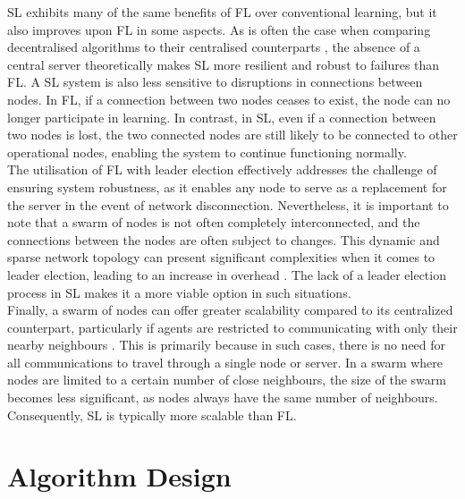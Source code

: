 \documentclass[letterpaper, 10 pt, conference]{ieeeconf}  %
\begin{document}
SL exhibits many of the same benefits of FL over conventional learning, but it also improves upon FL in some aspects. As is often the case when comparing decentralised algorithms to their centralised counterparts \cite{swarm_resil}, the absence of a central server theoretically makes SL more resilient and robust to failures than FL. A SL system is also less sensitive to disruptions in connections between nodes. In FL, if a connection between two nodes ceases to exist, the node can no longer participate in learning. In contrast, in SL, even if a connection between two nodes is lost, the two connected nodes are still likely to be connected to other operational nodes, enabling the system to continue functioning normally. \\

The utilisation of FL with leader election effectively addresses the challenge of ensuring system robustness, as it enables any node to serve as a replacement for the server in the event of network disconnection. Nevertheless, it is important to note that a swarm of nodes is not often completely interconnected, and the connections between the nodes are often subject to changes. This dynamic and sparse network topology can present significant complexities when it comes to leader election, leading to an increase in overhead \cite{leaderelection}. The lack of a leader election process in SL makes it a more viable option in such situations. \\

Finally, a swarm of nodes can offer greater scalability compared to its centralized counterpart, particularly if agents are restricted to communicating with only their nearby neighbours \cite{swarmscalable}. This is primarily because in such cases, there is no need for all communications to travel through a single node or server. In a swarm where nodes are limited to a certain number of close neighbours, the size of the swarm becomes less significant, as nodes always have the same number of neighbours. Consequently, SL is typically more scalable than FL.


\section{Algorithm Design} \label{des}
\end{document}
